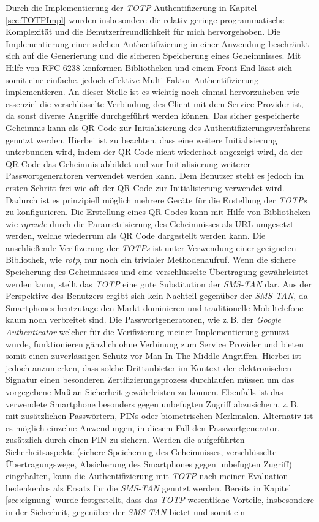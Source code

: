 \documentclass[11pt,a4paper,ngerman]{scrreprt}
\begin{document}
Durch die Implementierung der \textit{TOTP} Authentifizerung in Kapitel \ref{sec:TOTPImpl} wurden insbesondere die relativ geringe programmatische Komplexität und die Benutzerfreundlichkeit für mich hervorgehoben. Die Implementierung einer solchen Authentifizierung in einer Anwendung beschränkt sich auf die Generierung und die sicheren Speicherung eines Geheimnisses. Mit Hilfe von RFC 6238 konformen Bibliotheken und einem Front-End lässt sich somit eine einfache, jedoch effektive Multi-Faktor Authentifizierung implementieren. An dieser Stelle ist es wichtig noch einmal hervorzuheben wie essenziel die verschlüsselte Verbindung des Client mit dem Service Provider ist, da sonst diverse Angriffe durchgeführt werden können. Das sicher gespeicherte Geheimnis kann als QR Code zur Initialisierung des Authentifizierungsverfahrens genutzt werden. Hierbei ist zu beachten, dass eine weitere Initialisierung unterbunden wird, indem der QR Code nicht wiederholt angezeigt wird, da der QR Code das Geheimnis abbildet und zur Initialisierung weiterer Passwortgeneratoren verwendet werden kann. Dem Benutzer steht es jedoch im ersten Schritt frei wie oft der QR Code zur Initialisierung verwendet wird. Dadurch ist es prinzipiell möglich mehrere Geräte für die Erstellung der \textit{TOTPs} zu konfigurieren. Die Erstellung eines QR Codes kann mit Hilfe von Bibliotheken wie \textit{rqrcode} durch die Parametrisierung des Geheimnisses als URL umgesetzt werden, welche wiederrum als QR Code dargestellt werden kann. Die anschließende Verifizerung der \textit{TOTPs} ist unter Verwendung einer geeigneten Bibliothek, wie \textit{rotp}, nur noch ein trivialer Methodenaufruf. Wenn die sichere Speicherung des Geheimnisses und eine verschlüsselte Übertragung gewährleistet werden kann, stellt das \textit{TOTP} eine gute Substitution der \textit{SMS-TAN} dar. Aus der Perspektive des Benutzers ergibt sich kein Nachteil gegenüber der \textit{SMS-TAN}, da Smartphones heutzutage den Markt dominieren und traditionelle Mobiltelefone kaum noch verbreitet sind. Die Passwortgeneratoren, wie z.\,B. der \textit{Google Authenticator} welcher für die Verifizierung meiner Implementierung genutzt wurde, funktionieren gänzlich ohne Verbinung zum Service Provider und bieten somit einen zuverlässigen Schutz vor Man-In-The-Middle Angriffen. Hierbei ist jedoch anzumerken, dass solche Drittanbieter im Kontext der elektronischen Signatur einen besonderen Zertifizierungsprozess durchlaufen müssen um das vorgegebene Maß an Sicherheit gewährleisten zu können. Ebenfalls ist das verwendete Smartphone besonders gegen unbefugten Zugriff abzusichern, z.\,B. mit zusätzlichen Passwörtern, PINs oder biometrischen Merkmalen. Alternativ ist es möglich einzelne Anwendungen, in diesem Fall den Passwortgenerator, zusätzlich durch einen PIN zu sichern. Werden die aufgeführten Sicherheitsaspekte (sichere Speicherung des Geheimnisses, verschlüsselte Übertragungswege, Absicherung des Smartphones gegen unbefugten Zugriff) eingehalten, kann die Authentifizierung mit \textit{TOTP} nach meiner Evaluation bedenkenlos als Ersatz für die \textit{SMS-TAN} genutzt werden. Bereits in Kapitel \ref{sec:eignung} wurde festgestellt, dass das \textit{TOTP} wesentliche Vorteile, insbesondere in der Sicherheit, gegenüber der \textit{SMS-TAN} bietet und somit ein 
\end{document}
